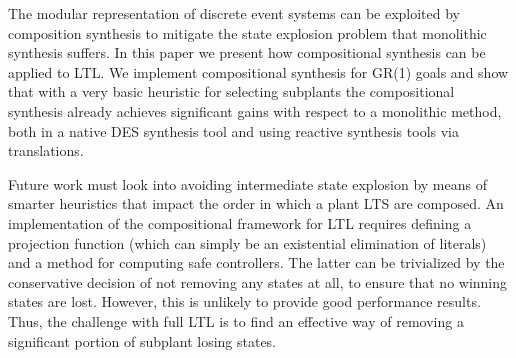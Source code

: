 The modular representation of discrete event systems can be exploited by composition synthesis to mitigate the state explosion problem that monolithic synthesis suffers. In this paper we present how compositional synthesis can be applied to LTL. We implement compositional synthesis for GR(1) goals and show that with a very basic heuristic for selecting subplants the compositional synthesis already achieves significant gains with respect to a monolithic method, both in a native DES synthesis tool and using reactive synthesis tools via translations. 


Future work must look into avoiding intermediate state explosion by means of smarter heuristics that impact the order in which a plant LTS are composed. An implementation of the compositional framework for LTL requires defining a projection function (which can simply be an existential elimination of  literals) and a method for computing safe controllers. The latter can be trivialized by the conservative decision of not removing any states at all, to ensure that no winning states are lost. However, this is unlikely to provide good performance results. Thus, the challenge with full LTL is to find an effective way of removing a significant portion of subplant losing states.  

